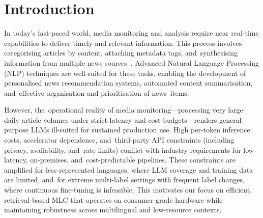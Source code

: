\documentclass[make,article,accept,pdftex,moreauthors]{Definitions/mdpi}
\begin{document}
\section{Introduction}
\label{sec:introduction}

In today's fast-paced world, media monitoring and analysis require near real-time capabilities to deliver timely and relevant information. 
This process involves categorising articles by content, attaching metadata tags, and~synthesising information from multiple news sources~\citep{rupnik2016news, zang2022event_detection,yoon2023story_detection}. 
Advanced Natural Language Processing (NLP) techniques are well-suited for these tasks, enabling the development of personalised news recommendation systems, automated content summarisation, and~effective organisation and prioritisation of news~items. 

However, the~operational reality of media monitoring—processing very large daily article volumes under strict latency and cost budgets—renders general-purpose LLMs ill-suited for sustained production use. High per-token inference costs, accelerator dependence, and~third-party API constraints (including privacy, availability, and~rate limits) conflict with industry requirements for low-latency, on-premises, and~cost-predictable pipelines. 
These constraints are amplified for less-represented languages, where LLM coverage and training data are limited, and~for extreme multi-label settings with frequent label changes, where continuous fine-tuning is infeasible. This motivates our focus on efficient, retrieval-based MLC that operates on consumer-grade hardware while maintaining robustness across multilingual and low-resource contexts.
\end{document}
